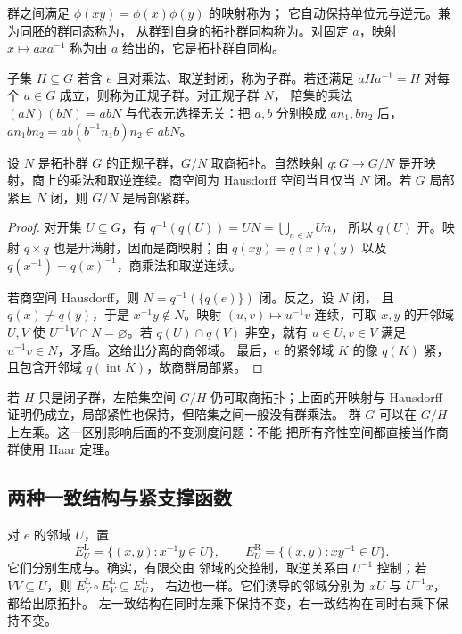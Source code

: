 群之间满足 $\phi(xy)=\phi(x)\phi(y)$ 的映射称为；
它自动保持单位元与逆元。兼为同胚的群同态称为，
从群到自身的拓扑群同构称为。对固定 $a$，映射
$x\mapsto axa^{-1}$ 称为由 $a$ 给出的，它是拓扑群自同构。

子集 $H\subseteq G$ 若含 $e$ 且对乘法、取逆封闭，称为子群。若还满足
$aHa^{-1}=H$ 对每个 $a\in G$ 成立，则称为正规子群。对正规子群 $N$，
陪集的乘法 $(aN)(bN)=abN$ 与代表元选择无关：把 $a,b$ 分别换成
$an_1,bn_2$ 后，$an_1bn_2=ab(b^{-1}n_1b)n_2\in abN$。

\begin{proposition}[商群]
\label{prop:topological-quotient-group}
设 $N$ 是拓扑群 $G$ 的正规子群，$G/N$ 取商拓扑。自然映射
$q:G\to G/N$ 是开映射，商上的乘法和取逆连续。商空间为 Hausdorff
空间当且仅当 $N$ 闭。若 $G$ 局部紧且 $N$ 闭，则 $G/N$ 是局部紧群。
\end{proposition}

\begin{proof}
对开集 $U\subseteq G$，有 $q^{-1}(q(U))=UN=\bigcup_{n\in N}Un$，
所以 $q(U)$ 开。映射 $q\times q$ 也是开满射，因而是商映射；由
$q(xy)=q(x)q(y)$ 以及 $q(x^{-1})=q(x)^{-1}$，商乘法和取逆连续。

若商空间 Hausdorff，则 $N=q^{-1}(\{q(e)\})$ 闭。反之，设 $N$ 闭，
且 $q(x)\ne q(y)$，于是 $x^{-1}y\notin N$。映射
$(u,v)\mapsto u^{-1}v$ 连续，可取 $x,y$ 的开邻域 $U,V$ 使
$U^{-1}V\cap N=\varnothing$。若 $q(U)\cap q(V)$ 非空，就有
$u\in U,v\in V$ 满足 $u^{-1}v\in N$，矛盾。这给出分离的商邻域。
最后，$e$ 的紧邻域 $K$ 的像 $q(K)$ 紧，且包含开邻域
$q(\operatorname{int}K)$，故商群局部紧。
\end{proof}

若 $H$ 只是闭子群，左陪集空间 $G/H$ 仍可取商拓扑；上面的开映射与
Hausdorff 证明仍成立，局部紧性也保持，但陪集之间一般没有群乘法。
群 $G$ 可以在 $G/H$ 上左乘。这一区别影响后面的不变测度问题：不能
把所有齐性空间都直接当作商群使用 Haar 定理。

\subsection{两种一致结构与紧支撑函数}

对 $e$ 的邻域 $U$，置
\[
 E_U^{\mathrm L}=\{(x,y):x^{-1}y\in U\},\qquad
 E_U^{\mathrm R}=\{(x,y):xy^{-1}\in U\}.
\]
它们分别生成与。确实，有限交由
邻域的交控制，取逆关系由 $U^{-1}$ 控制；若 $VV\subseteq U$，则
$E_V^{\mathrm L}\circ E_V^{\mathrm L}\subseteq E_U^{\mathrm L}$，
右边也一样。它们诱导的邻域分别为 $xU$ 与 $U^{-1}x$，都给出原拓扑。
左一致结构在同时左乘下保持不变，右一致结构在同时右乘下保持不变。

